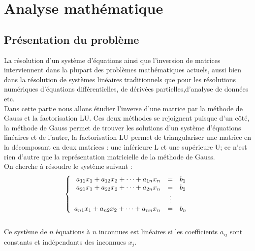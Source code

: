 \documentclass[a4paper,12pt]{report}
\begin{document}
\newpage

\chapter{Analyse mathématique}
\section{Présentation du problème}

La résolution d’un système d’équations ainsi que l’inversion de matrices interviennent dans la plupart des problèmes mathématiques actuels, aussi bien dans la résolution de systèmes linéaires traditionnels que pour les résolutions numériques d’équations différentielles, de dérivées partielles,d’analyse de données etc.\\

Dans cette partie nous allons étudier l’inverse d’une matrice par la méthode de Gauss et la factorisation LU. Ces deux méthodes se rejoignent puisque d'un côté, la méthode de Gauss permet de trouver les solutions d’un système d’équations linéaires et de l'autre, la factorisation LU permet de triangulariser une matrice en la décomposant en deux matrices : une inférieure L et une supérieure U; ce n'est rien d'autre que la représentation matricielle de la méthode de Gauss.
\\

On cherche à résoudre le système suivant : 
\[
\left\{
\begin{array}{r  c l}
a_{11}x_1+a_{12}x_2+\cdots+a_{1n}x_n &=& b_1\\
a_{21}x_1+a_{22}x_2+\cdots+a_{2n}x_n &=& b_2\\
&\vdots&\\
a_{n1}x_1+a_{n2}x_2+\cdots+a_{nn}x_n &=& b_n
\end{array}
\right.
\]\\
Ce système de $n$ équations à $n$ inconnues est linéaires si les coefficients $a_{ij}$ sont constants et indépendants des inconnues $x_{j}$. \\
\end{document}
